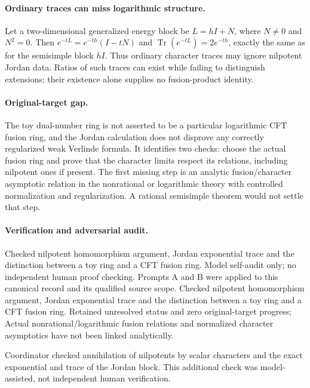 \documentclass[11pt]{article}
\begin{document}
\paragraph{Ordinary traces can miss logarithmic structure.} Let a two-dimensional generalized energy block be $L=hI+N$, where $N\ne0$ and $N^2=0$. Then $e^{-tL}=e^{-th}(I-tN)$ and $\operatorname{Tr}(e^{-tL})=2e^{-th}$, exactly the same as for the semisimple block $hI$. Thus ordinary character traces may ignore nilpotent Jordan data. Ratios of such traces can exist while failing to distinguish extensions; their existence alone supplies no fusion-product identity.

\paragraph{Original-target gap.} The toy dual-number ring is not asserted to be a particular logarithmic CFT fusion ring, and the Jordan calculation does not disprove any correctly regularized weak Verlinde formula. It identifies two checks: choose the actual fusion ring and prove that the character limits respect its relations, including nilpotent ones if present. The first missing step is an analytic fusion/character asymptotic relation in the nonrational or logarithmic theory with controlled normalization and regularization. A rational semisimple theorem would not settle that step.

\paragraph{Verification and adversarial audit.}
Checked nilpotent homomorphism argument, Jordan exponential trace and the distinction between a toy ring and a CFT fusion ring. Model self-audit only; no independent human proof checking. Prompts A and B were applied to this canonical record and its qualified source scope. Checked nilpotent homomorphism argument, Jordan exponential trace and the distinction between a toy ring and a CFT fusion ring. Retained unresolved status and zero original-target progress; Actual nonrational/logarithmic fusion relations and normalized character asymptotics have not been linked analytically.

Coordinator checked annihilation of nilpotents by scalar characters and the exact exponential and trace of the Jordan block. This additional check was model-assisted, not independent human verification.
\end{document}
